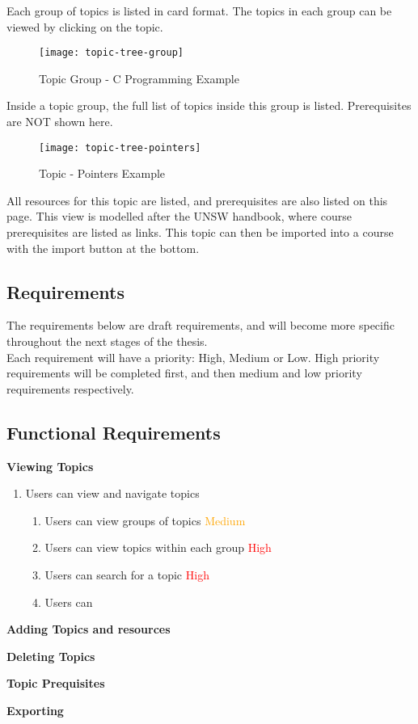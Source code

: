 Each group of topics is listed in card format. The topics in each group can be viewed by clicking on the topic.\\

\begin{figure}[h!]
    \centering
    \texttt{[image: topic-tree-group]}
    \caption{Topic Group - C Programming Example}
\end{figure}
\newpage

Inside a topic group, the full list of topics inside this group is listed. Prerequisites are NOT shown here. \\

\begin{figure}[h!]
    \centering
    \texttt{[image: topic-tree-pointers]}
    \caption{Topic - Pointers Example}
\end{figure}

All resources for this topic are listed, and prerequisites are also listed on this page. This view is modelled after the UNSW handbook, where course prerequisites are listed as links. This topic can then be imported into a course with the import button at the bottom.\\

\subsection{Requirements}
The requirements below are draft requirements, and will become more specific throughout the next stages of the thesis.\\
Each requirement will have a priority: High, Medium or Low. High priority requirements will be completed first, and then medium and low priority requirements respectively. \\

\subsection{Functional Requirements}

\textbf{Viewing Topics}
\begin{enumerate}
\item Users can view and navigate topics
    \begin{enumerate}
    \item Users can view groups of topics \textcolor{Orange}{Medium}
    \item Users can view topics within each group \textcolor{Red}{High}
    \item Users can search for a topic \textcolor{Red}{High}
    \item Users can 
    \end{enumerate}
\end{enumerate}

\textbf{Adding Topics and resources}

\textbf{Deleting Topics}

\textbf{Topic Prequisites}

\textbf{Exporting}
